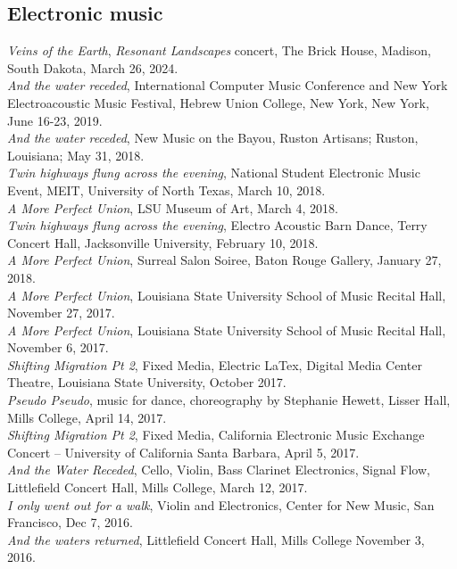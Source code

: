 \documentclass[12pt, a4paper]{article}
\newcommand{\years}[1]{\marginnote{\scriptsize #1}}
\begin{document}
\subsection*{Electronic music}
\years{2024} \textit{Veins of the Earth}, \textit{Resonant Landscapes} concert, The Brick House, Madison, South Dakota, March 26, 2024. \\
\years{2019} \textit{And the water receded}, International Computer Music Conference and New York Electroacoustic Music Festival, Hebrew Union College, New York, New York, June 16-23, 2019. \\
\years{2018} \textit{And the water receded}, New Music on the Bayou, Ruston Artisans; Ruston, Louisiana; May 31, 2018. \\  
\textit{Twin highways flung across the evening}, National Student Electronic Music Event, MEIT, University of North Texas, March 10, 2018. \\
\textit{A More Perfect Union}, LSU Museum of Art, March 4, 2018. \\
\textit{Twin highways flung across the evening}, Electro Acoustic Barn Dance, Terry Concert Hall, Jacksonville University, February 10, 2018. \\
\textit{A More Perfect Union}, Surreal Salon Soiree, Baton Rouge Gallery, January 27, 2018.\\
\years{2017}\textit{A  More Perfect Union}, Louisiana State University School of Music Recital Hall, November 27, 2017. \\
\textit{A More Perfect Union}, Louisiana State University School of Music Recital Hall, November 6, 2017.\\
\textit{Shifting Migration Pt 2}, Fixed Media, Electric LaTex, Digital Media Center Theatre, Louisiana State University, October 2017.\\
\textit{Pseudo Pseudo}, music for dance, choreography by Stephanie Hewett, Lisser Hall, Mills College, April 14, 2017. \\
\textit{Shifting Migration Pt 2}, Fixed Media, California Electronic Music Exchange Concert – University of California Santa Barbara, April 5, 2017.\\
\textit{And the Water Receded}, Cello, Violin, Bass Clarinet Electronics, Signal Flow, Littlefield Concert Hall, Mills College, March 12, 2017.\\
\years{2016} \textit{I only went out for a walk}, Violin and Electronics, Center for New Music, San Francisco, Dec 7, 2016. \\
\textit{And the waters returned}, Littlefield Concert Hall, Mills College November 3, 2016.\\
\end{document}
